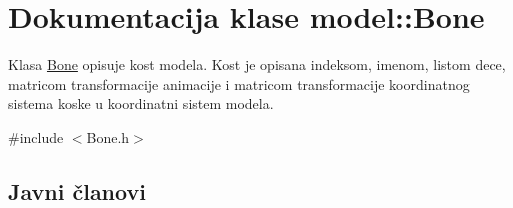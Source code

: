 \hypertarget{classmodel_1_1Bone}{}\section{Dokumentacija klase model\+:\+:Bone}
\label{classmodel_1_1Bone}


Klasa \hyperlink{classmodel_1_1Bone}{Bone} opisuje kost modela. Kost je opisana indeksom, imenom, listom dece, matricom transformacije animacije i matricom transformacije koordinatnog sistema koske u koordinatni sistem modela.  




{\ttfamily \#include $<$Bone.\+h$>$}

\subsection*{Javni članovi}
